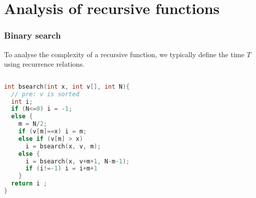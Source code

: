 \documentclass[aspectratio=169]{beamer}
\begin{document}








\section{Analysis of recursive functions}

\begin{frame}[fragile]\frametitle{Binary search}

To analyse the complexity of a recursive function, we typically define the time $T$ using \alert{recurrence relations}.

\begin{columns}
\begin{column}{0.48\textwidth}
\begin{lstlisting}[language=C++,emph={bsearch}]
int bsearch(int x, int v[], int N){
  // pre: v is sorted
  int i;
  if (N<=0) i = -1;
  else {
    m = N/2;
    if (v[m]==x) i = m;
    else if (v[m] > x)
      i = bsearch(x, v, m);
    else {
      i = bsearch(x, v+m+1, N-m-1);
      if (i!=-1) i = i+m+1
    }
  return i ;
}
\end{lstlisting}
\end{column}
  \begin{column}{0.48\textwidth}
    \small
  \end{column}
\end{columns}
\end{frame}
\end{document}
